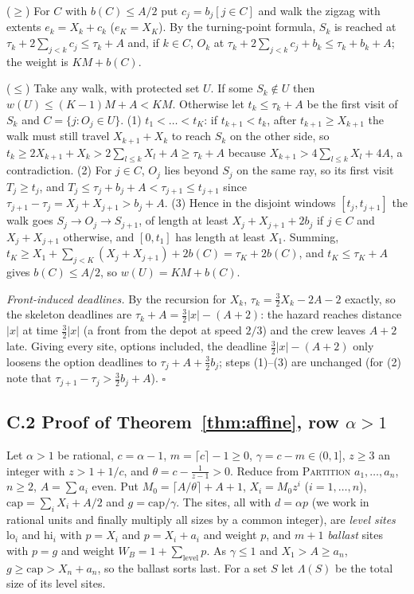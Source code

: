 \documentclass[pdflatex,sn-mathphys-ay]{sn-jnl}
\theoremstyle{thmstyleone}
\theoremstyle{thmstyletwo}
\theoremstyle{thmstylethree}
\begin{document}
\begin{appendices}
($\ge$) For $C$ with $b(C)\le A/2$ put $c_j=b_j[j\in C]$ and walk the
zigzag with extents $e_k=X_k+c_k$ ($e_K=X_K$). By the turning-point
formula, $S_k$ is reached at $\tau_k+2\sum_{j<k}c_j\le\tau_k+A$ and, if
$k\in C$, $O_k$ at $\tau_k+2\sum_{j<k}c_j+b_k\le\tau_k+b_k+A$; the weight
is $KM+b(C)$.

($\le$) Take any walk, with protected set $U$. If some $S_k\notin U$ then
$w(U)\le(K-1)M+A<KM$. Otherwise let $t_k\le\tau_k+A$ be the first visit of
$S_k$ and $C=\{j:O_j\in U\}$. (1) $t_1<\dots<t_K$: if $t_{k+1}<t_k$, after
$t_{k+1}\ge X_{k+1}$ the walk must still travel $X_{k+1}+X_k$ to reach
$S_k$ on the other side, so $t_k\ge2X_{k+1}+X_k>2\sum_{l\le k}X_l+A\ge\tau_k+A$
because $X_{k+1}>4\sum_{l\le k}X_l+4A$, a contradiction. (2) For
$j\in C$, $O_j$ lies beyond $S_j$ on the same ray, so its first visit
$T_j\ge t_j$, and $T_j\le\tau_j+b_j+A<\tau_{j+1}\le t_{j+1}$ since
$\tau_{j+1}-\tau_j=X_j+X_{j+1}>b_j+A$. (3) Hence in the disjoint windows
$[t_j,t_{j+1}]$ the walk goes $S_j\to O_j\to S_{j+1}$, of length at least
$X_j+X_{j+1}+2b_j$ if $j\in C$ and $X_j+X_{j+1}$ otherwise, and
$[0,t_1]$ has length at least $X_1$. Summing, $t_K\ge X_1+\sum_{j<K}(X_j+X_{j+1})+2b(C)=\tau_K+2b(C)$,
and $t_K\le\tau_K+A$ gives $b(C)\le A/2$, so $w(U)=KM+b(C)$.

\emph{Front-induced deadlines.} By the recursion for $X_k$,
$\tau_k=\tfrac32X_k-2A-2$ exactly, so the skeleton deadlines are
$\tau_k+A=\tfrac32|x|-(A+2)$: the hazard reaches distance $|x|$ at time
$\tfrac32|x|$ (a front from the depot at speed $2/3$) and the crew leaves
$A+2$ late. Giving every site, options included, the deadline
$\tfrac32|x|-(A+2)$ only loosens the option deadlines to
$\tau_j+A+\tfrac32b_j$; steps (1)--(3) are unchanged (for (2) note that
$\tau_{j+1}-\tau_j>\tfrac32b_j+A$). \hfill$\square$

\subsection*{C.2 Proof of Theorem~\ref{thm:affine}, row $\alpha>1$}

Let $\alpha>1$ be rational, $c=\alpha-1$, $m=\lceil c\rceil-1\ge0$,
$\gamma=c-m\in(0,1]$, $z\ge3$ an integer with $z>1+1/c$, and
$\theta=c-\frac1{z-1}>0$. Reduce from \textsc{Partition} $a_1,\dots,a_n$,
$n\ge2$, $A=\sum a_i$ even. Put $M_0=\lceil A/\theta\rceil+A+1$,
$X_i=M_0z^i$ ($i=1,\dots,n$), $\mathrm{cap}=\sum_iX_i+A/2$ and
$g=\mathrm{cap}/\gamma$. The sites, all with $d=\alpha p$ (we work in
rational units and finally multiply all sizes by a common integer), are
\emph{level sites} $\mathrm{lo}_i$ and $\mathrm{hi}_i$ with $p=X_i$ and
$p=X_i+a_i$ and weight $p$, and $m+1$ \emph{ballast} sites with $p=g$ and
weight $W_B=1+\sum_{\mathrm{level}}p$. As $\gamma\le1$ and $X_1>A\ge a_n$,
$g\ge\mathrm{cap}>X_n+a_n$, so the ballast sorts last. For a set $S$ let
$\Lambda(S)$ be the total size of its level sites.


\end{appendices}
\end{document}
